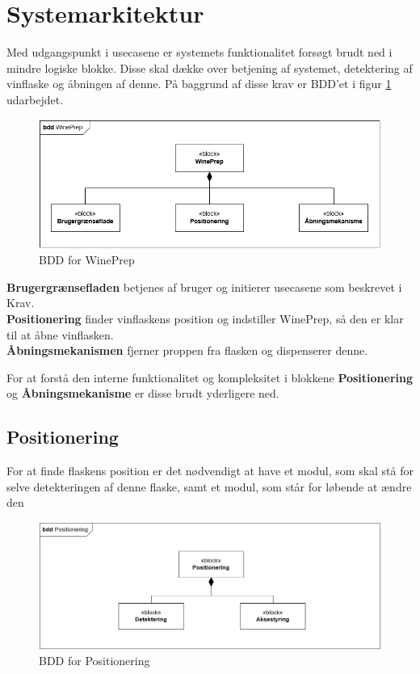 \section{Systemarkitektur}
Med udgangspunkt i usecasene er systemets funktionalitet forsøgt brudt ned i mindre logiske blokke. Disse skal dække over betjening af systemet, detektering af vinflaske og åbningen af denne. På baggrund af disse krav er BDD'et i figur \ref{BDD_WinePrep} udarbejdet.

\begin{figure}[H]
	\centerline{\includegraphics[scale=0.33]{tex/Arkitektur/Diagrammer/BDD_WinePrep}}
	\caption{BDD for WinePrep}
	\label{BDD_WinePrep}
\end{figure}

\textbf{Brugergrænsefladen} betjenes af bruger og initierer usecasene som beskrevet i Krav.
\\
\textbf{Positionering} finder vinflaskens position og indstiller WinePrep, så den er klar til at åbne vinflasken.
\\
\textbf{Åbningsmekanismen} fjerner proppen fra flasken og dispenserer denne.

For at forstå den interne funktionalitet og kompleksitet i blokkene \textbf{Positionering} og \textbf{Åbningsmekanisme} er disse brudt yderligere ned.

\subsection{Positionering}
For at finde flaskens position er det nødvendigt at have et modul, som skal stå for selve detekteringen af denne flaske, samt et modul, som står for løbende at ændre den 

\begin{figure}[H]
	\centerline{\includegraphics[scale=0.33]{tex/Arkitektur/Diagrammer/BDD_Positionering}}
	\caption{BDD for Positionering}
	\label{BDD_Positionering}
\end{figure}